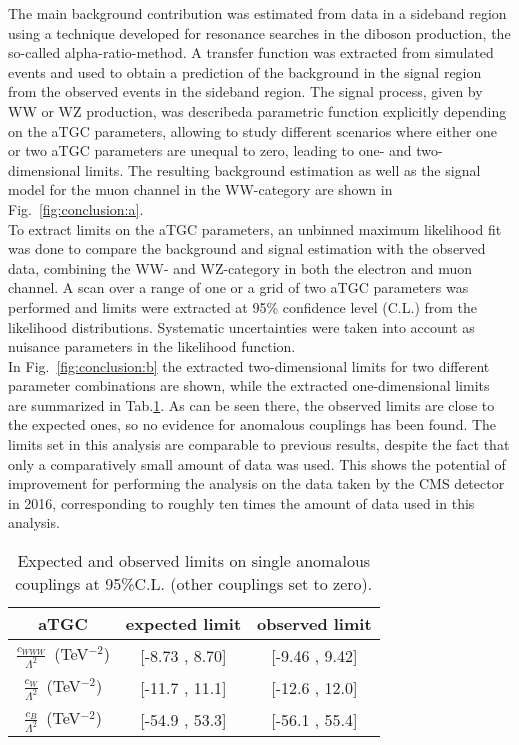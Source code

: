The main background contribution was estimated from data in a sideband region using a technique developed for resonance searches in the diboson production, the so-called alpha-ratio-method. A transfer function was extracted from simulated events and used to obtain a prediction of the background in the signal region from the observed events in the sideband region. The signal process, given by WW or WZ production, was describeda parametric function explicitly depending on the aTGC parameters, allowing to study different scenarios where either one or two aTGC parameters are unequal to zero, leading to one- and two-dimensional limits. The resulting background estimation as well as the signal model for the muon channel in the WW-category are shown in Fig.~\ref{fig:conclusion:a}.\\

To extract limits on the aTGC parameters, an unbinned maximum likelihood fit was done to compare the background and signal estimation with the observed data, combining the WW- and WZ-category in both the electron and muon channel. A scan over a range of one or a grid of two aTGC parameters was performed and limits were extracted at 95\% confidence level (C.L.) from the likelihood distributions. Systematic uncertainties were taken into account as nuisance parameters in the likelihood function.\\

In Fig.~\ref{fig:conclusion:b} the extracted two-dimensional limits for two different parameter combinations are shown, while the extracted one-dimensional limits are summarized in Tab.\ref{tab:conclusion:1d}. As can be seen there, the observed limits are close to the expected ones, so no evidence for anomalous couplings has been found. The limits set in this analysis are comparable to previous results, despite the fact that only a comparatively small amount of data was used. This shows the potential of improvement for performing the analysis on the data taken by the CMS detector in 2016, corresponding to roughly ten times the amount of data used in this analysis.

\begin{table}
	\centering
	\caption[Expected and observed limits on single anomalous couplings at 95\%C.L.]{Expected and observed limits on single anomalous couplings at 95\%C.L. (other couplings set to zero).}
	\label{tab:conclusion:1d}
	\begin{tabular}{ccc}
	\hline
	aTGC              &     expected limit & observed limit\\
	\hline
	$\frac{c_{WWW}}{\Lambda ^2}$~(TeV$^{-2}$) &  [-8.73 , 8.70] &  [-9.46 , 9.42] \\
	$\frac{c_{W}}{\Lambda ^2}$~(TeV$^{-2}$)   &  [-11.7 , 11.1] &  [-12.6 , 12.0] \\
	$\frac{c_{B}}{\Lambda ^2}$~(TeV$^{-2}$)   & [-54.9 , 53.3] &  [-56.1 , 55.4] \\
	\hline
	\end{tabular}
\end{table}


